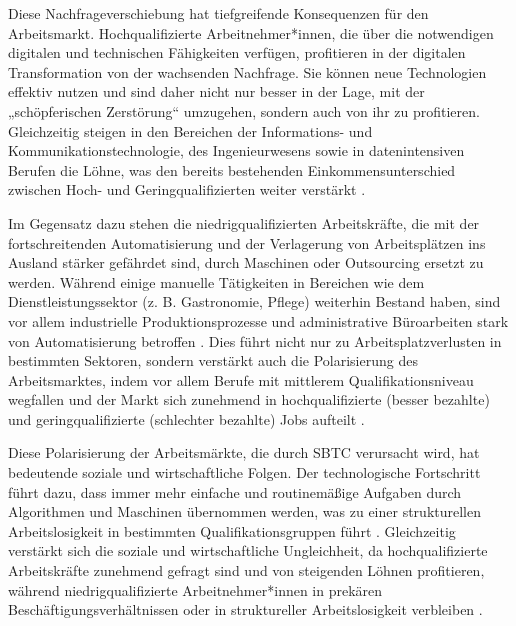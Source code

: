 Diese Nachfrageverschiebung hat tiefgreifende Konsequenzen für den Arbeitsmarkt. 
Hochqualifizierte Arbeitnehmer*innen, die über die notwendigen digitalen und technischen 
Fähigkeiten verfügen, profitieren in der digitalen Transformation von der wachsenden 
Nachfrage. Sie können neue Technologien effektiv nutzen und sind daher nicht nur besser in 
der Lage, mit der „schöpferischen Zerstörung“ \parencite[vgl.][S. 81]{schumpeter1976capitalism} 
umzugehen, sondern auch von ihr zu profitieren. Gleichzeitig steigen in den Bereichen der 
Informations- und Kommunikationstechnologie, des Ingenieurwesens sowie in datenintensiven 
Berufen die Löhne, was den bereits bestehenden Einkommensunterschied zwischen Hoch- und 
Geringqualifizierten weiter verstärkt \parencite[vgl.][S. 2511]{goos2014explaining}.

Im Gegensatz dazu stehen die niedrigqualifizierten Arbeitskräfte, die mit der fortschreitenden 
Automatisierung und der Verlagerung von Arbeitsplätzen ins Ausland stärker gefährdet sind, 
durch Maschinen oder Outsourcing ersetzt zu werden. Während einige manuelle Tätigkeiten in 
Bereichen wie dem Dienstleistungssektor (z. B. Gastronomie, Pflege) weiterhin Bestand haben, 
sind vor allem industrielle Produktionsprozesse und administrative Büroarbeiten stark von 
Automatisierung betroffen \parencite[vgl.][S. 260]{frey2013thefuture}. Dies führt nicht nur zu 
Arbeitsplatzverlusten in bestimmten Sektoren, sondern verstärkt auch die Polarisierung des 
Arbeitsmarktes, indem vor allem Berufe mit mittlerem Qualifikationsniveau wegfallen und der 
Markt sich zunehmend in hochqualifizierte (besser bezahlte) und geringqualifizierte 
(schlechter bezahlte) Jobs aufteilt \parencite[vgl.][S. 1283]{autor2003theskill}.

Diese Polarisierung der Arbeitsmärkte, die durch \ac{SBTC} verursacht wird, hat bedeutende soziale 
und wirtschaftliche Folgen. Der technologische Fortschritt führt dazu, dass immer mehr 
einfache und routinemäßige Aufgaben durch Algorithmen und Maschinen übernommen werden, was zu 
einer strukturellen Arbeitslosigkeit in bestimmten Qualifikationsgruppen führt 
\parencite[vgl.][S. 2512]{goos2014explaining}. Gleichzeitig verstärkt sich die soziale und 
wirtschaftliche Ungleichheit, da hochqualifizierte Arbeitskräfte zunehmend gefragt sind und 
von steigenden Löhnen profitieren, während niedrigqualifizierte Arbeitnehmer*innen in 
prekären Beschäftigungsverhältnissen oder in struktureller Arbeitslosigkeit verbleiben 
\parencite[vgl.][S. 12]{arntz2016therisk}.

